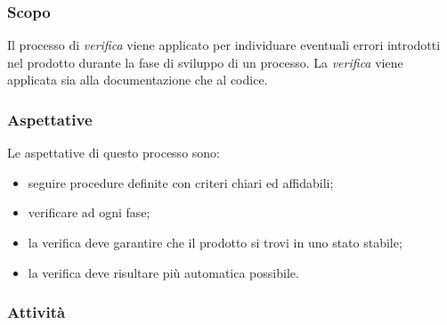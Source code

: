 			\subsubsection{Scopo}
				Il processo di \emph{verifica} viene applicato per individuare eventuali errori introdotti nel prodotto durante la fase di sviluppo di un processo. La \emph{verifica} viene applicata sia alla documentazione che al codice. %
			\subsubsection{Aspettative}
				Le aspettative di questo processo sono:
					\begin{itemize}
						\item seguire procedure definite con criteri chiari ed affidabili;
						\item verificare ad ogni fase;
						\item la verifica deve garantire che il prodotto si trovi in uno stato stabile;
						\item la verifica deve risultare più automatica possibile.
					\end{itemize}
				
			\subsubsection{Attività}
